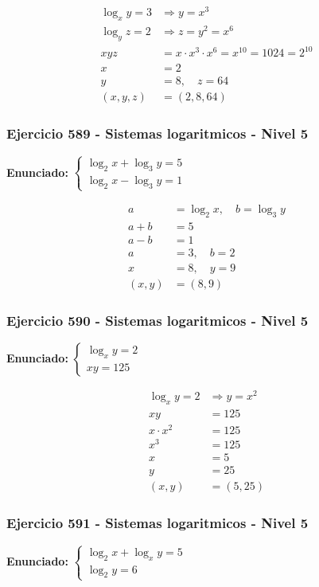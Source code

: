 \documentclass[12pt,a4paper]{article}
\begin{document}
\[
\begin{aligned}
\log_xy=3&\Rightarrow y=x^3\\
\log_yz=2&\Rightarrow z=y^2=x^6\\
xyz&=x\cdot x^3\cdot x^6=x^{10}=1024=2^{10}\\
x&=2\\
y&=8,
\quad z=64\\
(x,y,z)&=\boxed{(2,8,64)}
\end{aligned}
\]


\subsubsection*{Ejercicio 589 - Sistemas logaritmicos - Nivel 5}
\textbf{Enunciado:} \(\begin{cases}\log_2x+\log_3y=5\\ \log_2x-\log_3y=1\end{cases}\)

\[
\begin{aligned}
a&=\log_2x,
\quad b=\log_3y\\
a+b&=5\\
a-b&=1\\
a&=3,
\quad b=2\\
x&=8,
\quad y=9\\
(x,y)&=\boxed{(8,9)}
\end{aligned}
\]


\subsubsection*{Ejercicio 590 - Sistemas logaritmicos - Nivel 5}
\textbf{Enunciado:} \(\begin{cases}\log_xy=2\\ xy=125\end{cases}\)

\[
\begin{aligned}
\log_xy=2&\Rightarrow y=x^2\\
xy&=125\\
x\cdot x^2&=125\\
x^3&=125\\
x&=5\\
y&=25\\
(x,y)&=\boxed{(5,25)}
\end{aligned}
\]


\subsubsection*{Ejercicio 591 - Sistemas logaritmicos - Nivel 5}
\textbf{Enunciado:} \(\begin{cases}\log_2x+\log_xy=5\\ \log_2y=6\end{cases}\)
\end{document}
